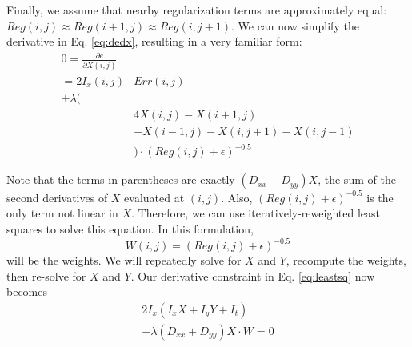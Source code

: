 \documentclass[10pt,twocolumn,letterpaper]{article}
\begin{document}
Finally, we assume that nearby regularization terms are approximately equal: $Reg(i, j) \approx Reg(i+1,j) \approx Reg(i,j+1)$.  We can now simplify the derivative in Eq. \ref{eq:dedx}, resulting in a very familiar form:
\begin{equation} \label{eq:leastsq}
\begin{aligned}
0 = \frac{\partial e}{\partial X(i, j)} \\
 = 2I_x(i, j) & Err(i, j)   \\
+\lambda(&\\
&4X(i, j) - X(i+1,j) \\
&- X(i-1,j) - X(i,j+1) - X(i,j-1) \\
&)\cdot (Reg(i, j) + \epsilon) ^{-0.5}
\end{aligned}
\end{equation}

Note that the terms in parentheses are exactly $(D_{xx} + D_{yy}) X$, the sum of the second derivatives of $X$ evaluated at $(i, j)$.  Also, $(Reg(i, j) + \epsilon)^{-0.5}$ is the only term not linear in $X$.  Therefore, we can use iteratively-reweighted least squares to solve this equation.  In this formulation,
\begin{equation} \label{eq:weights}
W(i,j) = (Reg(i,j) + \epsilon)^{-0.5}
\end{equation}
will be the weights.  We will repeatedly solve for $X$ and $Y$, recompute the weights, then re-solve for $X$ and $Y$.  Our derivative constraint in Eq. \ref{eq:leastsq} now becomes
\begin{equation} \label{eq:leastsqx}
\begin{aligned}
2I_x (I_x X + I_y Y + I_t) \\
 -\lambda(D_{xx} + D_{yy}) X \cdot W = 0
\end{aligned}
\end{equation}
\end{document}
